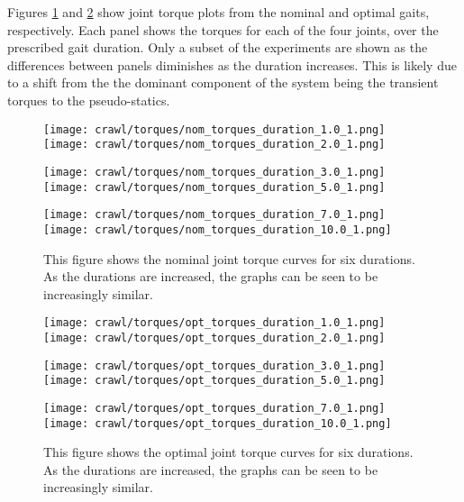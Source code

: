 Figures \ref{fig:vrep_nom_joint_torques_by_duration1} and \ref{fig:vrep_opt_joint_torques_by_duration1}
show joint torque plots from the nominal and optimal gaits, respectively.
Each panel shows the torques for each of the four joints, over the prescribed gait duration.
Only a subset of the experiments are shown as the differences between panels diminishes
as the duration increases. This is likely due to a shift from the the dominant component 
of the system being the transient torques to the pseudo-statics.

\begin{figure}
  \centerline{
    \texttt{[image: crawl/torques/nom\_torques\_duration\_1.0\_1.png]}
    \texttt{[image: crawl/torques/nom\_torques\_duration\_2.0\_1.png]}
  }
  \centerline{
    \texttt{[image: crawl/torques/nom\_torques\_duration\_3.0\_1.png]}
    \texttt{[image: crawl/torques/nom\_torques\_duration\_5.0\_1.png]}
  }
  \centerline{
    \texttt{[image: crawl/torques/nom\_torques\_duration\_7.0\_1.png]}
    \texttt{[image: crawl/torques/nom\_torques\_duration\_10.0\_1.png]}
  }
  \caption{This figure shows the nominal joint torque curves for six durations.
           As the durations are increased, the graphs can be seen to be increasingly
           similar.}
  \label{fig:vrep_nom_joint_torques_by_duration1}
\end{figure}

\begin{figure}
  \centerline{
    \texttt{[image: crawl/torques/opt\_torques\_duration\_1.0\_1.png]}
    \texttt{[image: crawl/torques/opt\_torques\_duration\_2.0\_1.png]}
  }
  \centerline{
    \texttt{[image: crawl/torques/opt\_torques\_duration\_3.0\_1.png]}
    \texttt{[image: crawl/torques/opt\_torques\_duration\_5.0\_1.png]}
  }
  \centerline{
    \texttt{[image: crawl/torques/opt\_torques\_duration\_7.0\_1.png]}
    \texttt{[image: crawl/torques/opt\_torques\_duration\_10.0\_1.png]}
  }
  \caption{This figure shows the optimal joint torque curves for six durations.
           As the durations are increased, the graphs can be seen to be increasingly
           similar.}
  \label{fig:vrep_opt_joint_torques_by_duration1}
\end{figure}


